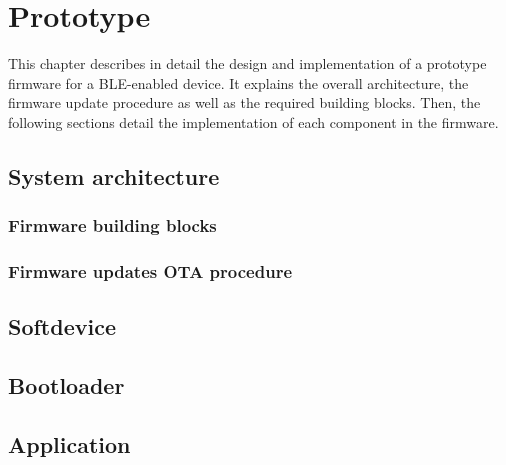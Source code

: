 \section{Prototype}
This chapter describes in detail the design and implementation of a prototype 
firmware for a BLE-enabled device. It explains the overall architecture, the 
firmware update procedure as well as the required building blocks. 
Then, the following sections detail the implementation of each component 
in the firmware.

\subsection{System architecture}

\subsubsection{Firmware building blocks}

\subsubsection{Firmware updates OTA procedure}

\subsection{Softdevice}

\subsection{Bootloader}

\subsection{Application}
